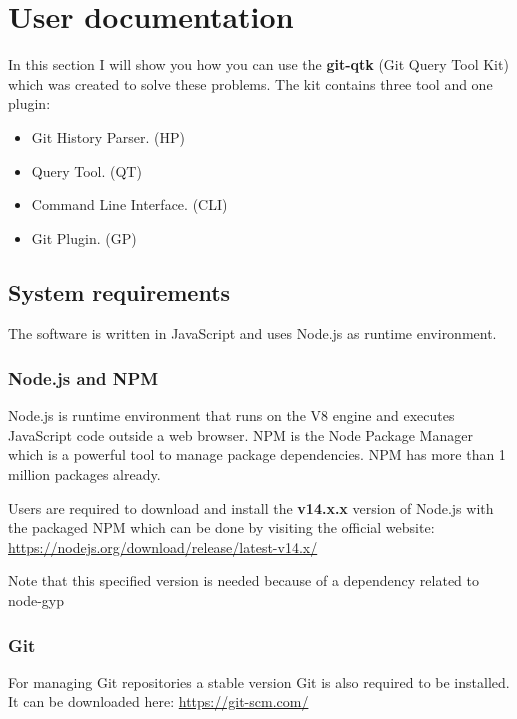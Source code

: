\chapter{User documentation}
\label{ch:user}

In this section I will show you how you can use the \textbf{git-qtk} (Git Query Tool Kit) which was created to solve these problems. 
The kit contains three tool and one plugin:

\begin{itemize}
\item Git History Parser. (HP)
\item Query Tool. (QT)
\item Command Line Interface. (CLI)
\item Git Plugin. (GP)
\end{itemize}

\section{System requirements}
The software is written in JavaScript and uses Node.js\cite{node.js} as runtime environment.

\subsection{Node.js and NPM}
Node.js is runtime environment that runs on the V8 engine and executes JavaScript code outside a web browser. 
NPM is the Node Package Manager which is a powerful tool to manage package dependencies. NPM has more than 1 million packages\cite{npm-count} already. \newline

Users are required to download and install the \textbf{v14.x.x} version of Node.js with the packaged NPM which can be done by visiting the official website:\newline
\url{https://nodejs.org/download/release/latest-v14.x/}
\newline 

Note that this specified version is needed because of a dependency related to node-gyp\cite{node-gyp-14}
 
\subsection{Git}
For managing Git repositories a stable version Git is also required to be installed. It can be downloaded here:\newline 
\url{https://git-scm.com/}
 
